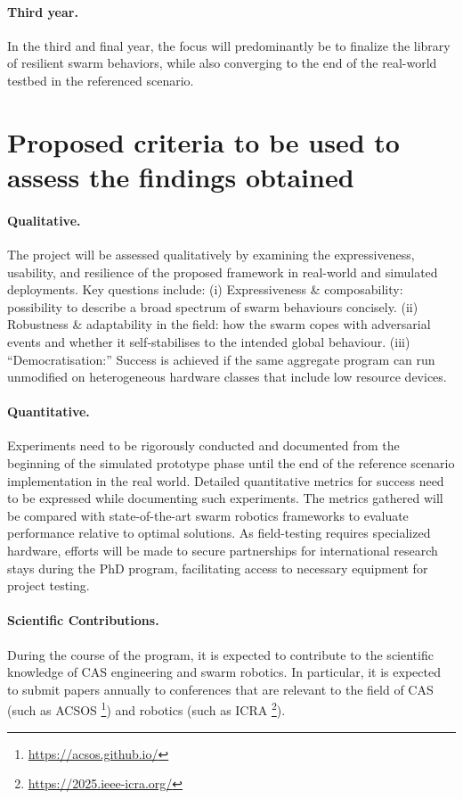 \documentclass[12pt]{article}
\begin{document}
\paragraph{Third year.} In the third and final year, the focus will predominantly be to finalize the library of resilient swarm behaviors, while also converging to the end of the real-world testbed in the referenced scenario.

\section{Proposed criteria to be used to assess the findings obtained}

\paragraph{Qualitative.}
The project will be assessed qualitatively by examining the expressiveness, usability, and resilience of the proposed framework in real-world and simulated deployments.  
Key questions include:  
(i) Expressiveness \& composability: possibility to describe a broad spectrum of swarm behaviours concisely. 
(ii) Robustness \& adaptability in the field: how the swarm copes with adversarial events and whether it self‑stabilises to the intended global behaviour.  
(iii) “Democratisation:” Success is achieved if the same aggregate program can run unmodified on heterogeneous hardware classes that include low resource devices.


\paragraph{Quantitative.}
Experiments need to be rigorously conducted and documented from the beginning of the simulated prototype phase until the end of the reference scenario implementation in the real world.
Detailed quantitative metrics for success need to be expressed while documenting such experiments. 
The metrics gathered will be compared with state-of-the-art swarm robotics frameworks to evaluate performance relative to optimal solutions.
As field-testing requires specialized hardware, efforts will be made to secure partnerships for international research stays during the PhD program, facilitating access to necessary equipment for project testing.

\paragraph{Scientific Contributions.}
During the course of the program, it is expected to contribute to the scientific knowledge of CAS engineering and swarm robotics. 
In particular, it is expected to submit papers annually to conferences that are relevant to the field of CAS (such as ACSOS \footnote{\url{https://acsos.github.io/}}) and robotics (such as ICRA \footnote{\url{https://2025.ieee-icra.org/}}).

\clearpage

\renewcommand{\refname}{References}



\end{document}

